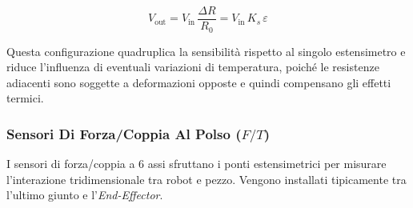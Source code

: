 ﻿\documentclass[11pt, a4paper]{article}
\begin{document}
\begin{minipage}{0.5\textwidth}
\begin{center}
    \end{center}
\end{minipage}%
\begin{minipage}{0.5\textwidth}
    \[
        V_{\text{out}} = V_{\text{in}} \, \frac{\Delta R}{R_0} = V_{\text{in}} \, K_s \, \varepsilon
    \]
\end{minipage}

Questa configurazione quadruplica la sensibilità rispetto al singolo estensimetro e riduce l'influenza di eventuali variazioni di temperatura, poiché le resistenze adiacenti sono soggette a deformazioni opposte e quindi compensano gli effetti termici.
\newpage

\subsubsection{Sensori Di Forza/Coppia Al Polso (\texorpdfstring{$F/T$}{F/T})}
I sensori di forza/coppia a 6 assi sfruttano i ponti estensimetrici per misurare l'interazione tridimensionale tra robot e pezzo. Vengono installati tipicamente tra l'ultimo giunto e l'\textit{End-Effector}.
\end{document}
